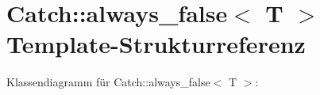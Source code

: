 \hypertarget{structCatch_1_1always__false}{}\section{Catch\+:\+:always\+\_\+false$<$ T $>$ Template-\/\+Strukturreferenz}
\label{structCatch_1_1always__false}


Klassendiagramm für Catch\+:\+:always\+\_\+false$<$ T $>$\+:
